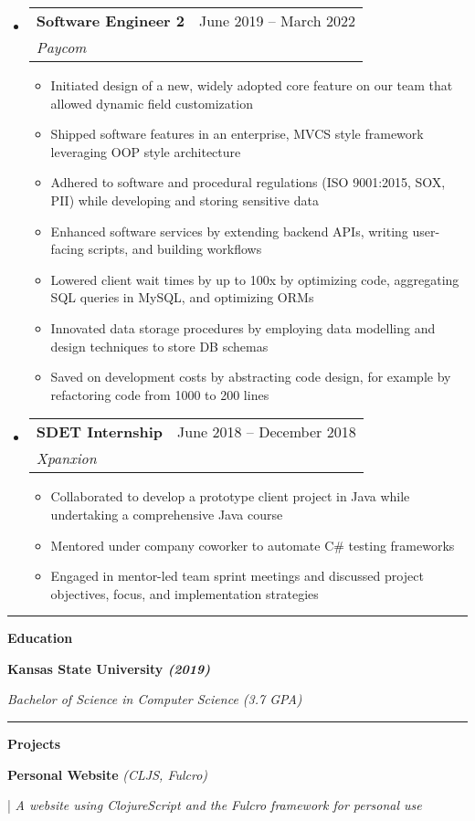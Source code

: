 \documentclass[letterpaper,11pt]{article}
\makeatletter
\newcommand{\resumeItem}[1]{
  \item\small{
    {#1 \vspace{-2pt}}
  }
}
\newcommand{\resumeSubheading}[4]{
  \vspace{-2pt}\item
    \begin{tabular*}{0.97\textwidth}[t]{l@{\extracolsep{\fill}}r}
      \textbf{#1} & #2 \\
      \textit{\small#3} & \textit{\small #4} \\
    \end{tabular*}\vspace{0pt}
}
\newcommand{\resumeSubHeadingListStart}{\begin{itemize}[leftmargin=0.15cm, label={}]}
\newcommand{\resumeSubHeadingListEnd}{\end{itemize}}
\newcommand{\resumeItemListStart}{\begin{itemize}}
\newcommand{\resumeItemListEnd}{\end{itemize}\vspace{-5pt}}
\makeatother
\begin{document}
\resumeSubHeadingListStart
\resumeSubheading
{Software Engineer 2}{June 2019 – March 2022}
{Paycom}{}
\resumeItemListStart
\resumeItem{ Initiated design of a new, widely adopted core feature on our team that allowed dynamic field customization }
\resumeItem{ Shipped software features in an enterprise, MVCS style framework leveraging OOP style architecture}
\resumeItem{ Adhered to software and procedural regulations (ISO 9001:2015, SOX, PII) while developing and storing sensitive data }
\resumeItem{ Enhanced software services by extending backend APIs, writing user-facing scripts, and building workflows }
\resumeItem{ Lowered client wait times by up to 100x by optimizing code, aggregating SQL queries in MySQL, and optimizing ORMs }
\resumeItem{ Innovated data storage procedures by employing data modelling and design techniques to store DB schemas }
\resumeItem{ Saved on development costs by abstracting code design, for example by refactoring code from 1000 to 200 lines }
\resumeItemListEnd
\resumeSubHeadingListEnd
\resumeSubHeadingListStart
\resumeSubheading
{SDET Internship}{June 2018 – December 2018}
{Xpanxion}{}
\resumeItemListStart
\resumeItem{ Collaborated to develop a prototype client project in Java while undertaking a comprehensive Java course }
\resumeItem{ Mentored under company coworker to automate C\# testing frameworks }
\resumeItem{ Engaged in mentor-led team sprint meetings and discussed project objectives, focus, and implementation strategies }
\resumeItemListEnd
\resumeSubHeadingListEnd
\noindent\rule{19.5cm}{0.4pt}

\textbf{\large \textcolor{magic_blue}{Education}}

\begin{minipage}[t]{0.45\textwidth}
	\raggedright
	\textbf{ Kansas State University \textit{(2019)}} \\
\end{minipage}
\hfill
\begin{minipage}[t]{0.45\textwidth}
	\raggedleft
	\textit{Bachelor of Science in Computer Science (3.7 GPA)} \\
\end{minipage}
\noindent\rule{19.5cm}{0.4pt}

\textbf{\large \textcolor{magic_blue}{Projects}}

\begin{minipage}[t]{0.28\textwidth}
	\raggedright
	\textbf{ Personal Website }\textit{(CLJS, Fulcro)} \\
\end{minipage}
\hfill
\begin{minipage}[t]{0.70\textwidth}
	\raggedright
	|\textit{ A website using ClojureScript and the Fulcro framework for personal use} \\
\end{minipage}
\end{document}
